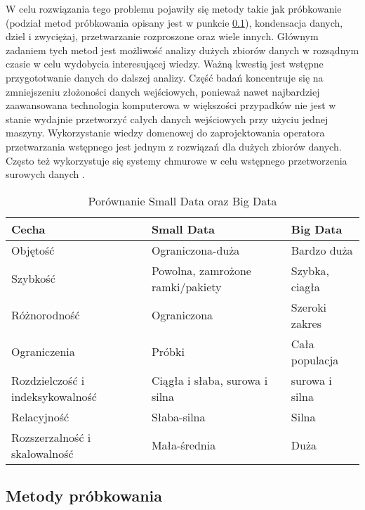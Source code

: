 \documentclass{article}
\begin{document}
W celu rozwiązania tego problemu pojawiły się metody takie jak próbkowanie (podział metod próbkowania opisany jest w punkcie \ref{sampling_methods}), kondensacja danych, dziel i zwyciężaj, przetwarzanie rozproszone oraz wiele innych. Głównym zadaniem tych metod jest możliwość analizy dużych zbiorów danych w rozsądnym czasie w celu wydobycia interesującej wiedzy. Ważną kwestią jest wstępne przygototwanie danych do dalszej analizy. Część badań  koncentruje się na zmniejszeniu złożoności danych wejściowych, ponieważ nawet najbardziej zaawansowana technologia komputerowa w większości przypadków nie jest w stanie wydajnie przetworzyć całych danych wejściowych przy użyciu jednej maszyny. Wykorzystanie wiedzy domenowej do zaprojektowania operatora przetwarzania wstępnego jest jednym z rozwiązań dla dużych zbiorów danych. Często też wykorzystuje się systemy chmurowe w celu wstępnego przetworzenia surowych danych \cite{10.5555/2559492}.


\begin{table}[h!]
    \centering
  \begin{tabular}{ |p{4cm}||p{4cm}|p{4cm}|  }
 \hline
Cecha& Small Data& Big Data\\
 \hline
 \hline
Objętość & Ograniczona-duża & Bardzo duża\\
\hline
Szybkość & Powolna, zamrożone ramki/pakiety & Szybka, ciagła\\
\hline
Różnorodność & Ograniczona & Szeroki zakres\\
\hline
Ograniczenia & Próbki & Cała populacja\\
\hline
Rozdzielczość i indeksykowalność & Ciągła i słaba, surowa i silna & surowa i silna\\
\hline
Relacyjność & Słaba-silna & Silna\\
\hline
Rozszerzalność i skalowalność & Mała-średnia & Duża\\
 \hline
\end{tabular}
    \caption{Porównanie Small Data oraz Big Data}
    \label{tab:my_label}
\end{table}



\subsection{Metody próbkowania}
\label{sampling_methods}
\end{document}
